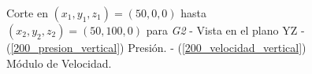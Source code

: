 \documentclass[10pt,a4paper,final]{article}
\begin{document}
\begin{figure}[tbhp]
   \centering
   \hspace{0.1\linewidth}
    \caption{Corte en $(x_1,y_1,z_1)=(50,0,0)$ hasta $(x_2,y_2,z_2)=(50,100,0)$ para \emph{G2} - Vista en el plano YZ - (\ref{200_presion_vertical}) Presión. - (\ref{200_velocidad_vertical}) Módulo de Velocidad.}
   \label{200_velocidad_presion_vertical}                %
\end{figure}
\end{document}
